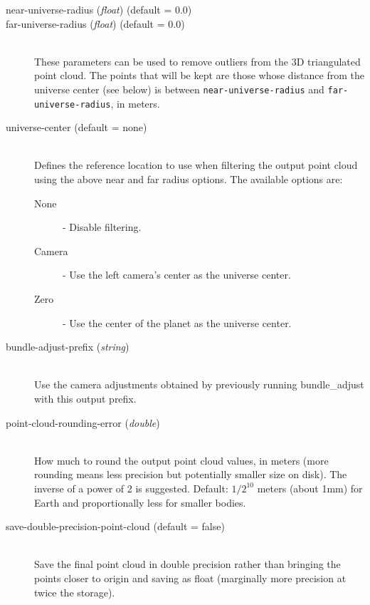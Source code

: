 \begin{description}
\item[near-universe-radius \textnormal{\small{(\emph{float})}} (default = 0.0)]
\item[far-universe-radius \textnormal{\small{(\emph{float})}} (default = 0.0)] \hfill \\

These parameters can be used to remove outliers from the 3D triangulated
point cloud. The points that will be kept are those whose distance from
the universe center (see below) is between \texttt{near-universe-radius}
and \texttt{far-universe-radius}, in meters.

\item[universe-center \textnormal (default = none)] \hfill \\
Defines the reference location to use when filtering the output point cloud
using the above near and far radius options. The available options
are:

  \begin{description}
    \item[None] - Disable filtering.
    \item[Camera] - Use the left camera's center as the universe center.
    \item[Zero]   - Use the center of the planet as the universe center.
  \end{description}

\item[bundle-adjust-prefix \textnormal{\small{(\emph{string})}}] \hfill \\ Use the camera adjustments obtained by previously running bundle\_adjust with this output prefix.

\item[point-cloud-rounding-error \textnormal{\small{(\emph{double})}}] \hfill \\

How much to round the output point cloud values, in meters (more
rounding means less precision but potentially smaller size on disk). The
inverse of a power of 2 is suggested. Default: $1/2^{10}$ meters (about 1mm) for Earth and
proportionally less for smaller bodies.

\item[save-double-precision-point-cloud \textnormal (default = false)] \hfill \\

Save the final point cloud in double precision rather than bringing the
points closer to origin and saving as float (marginally more precision
at twice the storage).


\end{description}
